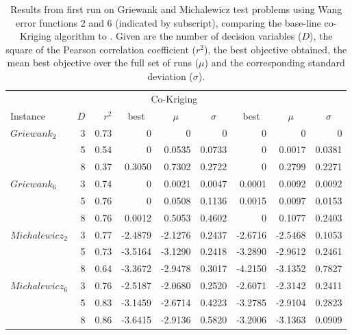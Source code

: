 \documentclass[journal]{IEEEtran}
\begin{document}
\begin{table}[h!]
\centering
\caption{Results from first run  on Griewank and Michalewicz test problems using Wang error functions 2 and 6 (indicated by subscript), comparing the base-line co-Kriging algorithm to \AlgName{}. Given are the number of decision variables ($D$), the square of the Pearson correlation coefficient ($r^2$), the best objective obtained, the mean best objective over the full set of runs ($\mu$) and the corresponding standard deviation ($\sigma$).}\label{tab:results}
\begin{tabular}{lrrrrrrrr} \toprule
& & & \multicolumn{3}{c}{Co-Kriging} & \multicolumn{3}{c}{\AlgName{}}\\
\cmidrule(lr){4-6} \cmidrule(lr){7-9}
Instance & $D$ & $r^2$ & \multicolumn{1}{c}{best}&\multicolumn{1}{c}{\(\mu\)} & \multicolumn{1}{c}{\(\sigma\)}&\multicolumn{1}{c}{best}& \multicolumn{1}{c}{\(\mu\)}&\multicolumn{1}{c}{\(\sigma\)}\\ \midrule
%
$Griewank_{2}$    & 3 & 0.73 &        0 &       0 &       0 &       0 &        0 &       0\\
                  & 5 & 0.54 &        0 &  0.0535 &  0.0733 &       0 &   0.0017 &  0.0381\\
                  & 8 & 0.37 &   0.3050 &  0.7302 &  0.2722 &       0 &   0.2799 &  0.2271\\
$Griewank_{6}$    & 3 & 0.74 &        0 &  0.0021 &  0.0047 &  0.0001 &   0.0092 &  0.0092\\
                  & 5 & 0.76 &        0 &  0.0508 &  0.1136 &  0.0015 &   0.0097 &  0.0153\\
                  & 8 & 0.76 &   0.0012 &  0.5053 &  0.4602 &       0 &   0.1077 &  0.2403\\
\midrule  
$Michalewicz_{2}$ & 3 & 0.77 &  -2.4879 & -2.1276 &  0.2437 & -2.6716 &  -2.5468 &  0.1053\\
                  & 5 & 0.73 &  -3.5164 & -3.1290 &  0.2418 & -3.2890 &  -2.9612 &  0.2461\\
                  & 8 & 0.64 &  -3.3672 & -2.9478 &  0.3017 & -4.2150 &  -3.1352 &  0.7827\\
$Michalewicz_{6}$ & 3 & 0.76 &  -2.5187 & -2.0680 &  0.2520 & -2.6071 &  -2.3142 &  0.2411\\
                  & 5 & 0.83 &  -3.1459 & -2.6714 &  0.4223 & -3.2785 &  -2.9104 &  0.2823\\
                  & 8 & 0.86 &  -3.6415 & -2.9136 &  0.5820 & -3.2006 &  -3.1363 &  0.0909\\
%
\bottomrule
\end{tabular}
\end{table}
\end{document}
